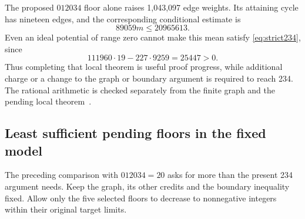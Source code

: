 \documentclass[11pt,a4paper]{article}
\theoremstyle{definition}
\theoremstyle{remark}
\begin{document}
The proposed $012034$ floor alone raises 1,043,097 edge weights. Its attaining
cycle has nineteen edges, and the corresponding conditional estimate is
\[
89059m\le20965613.
\]
Even an ideal potential of range zero cannot make this mean satisfy
\eqref{eq:strict234}, since
\[
111960\cdot19-227\cdot9259=25447>0.
\]
Thus completing that local theorem is useful proof progress, while additional
charge or a change to the graph or boundary argument is required to reach
234. The rational arithmetic is checked separately from the finite graph and
the pending local theorem~\cite{targetsharearchive}.

\subsection{Least sufficient pending floors in the fixed model}\label{sec:least-floors}
The preceding comparison with $012034=20$ asks for more than the present
234 argument needs. Keep the graph, its other credits and the boundary
inequality fixed. Allow only the five selected floors to decrease to
nonnegative integers within their original target limits.
\end{document}
